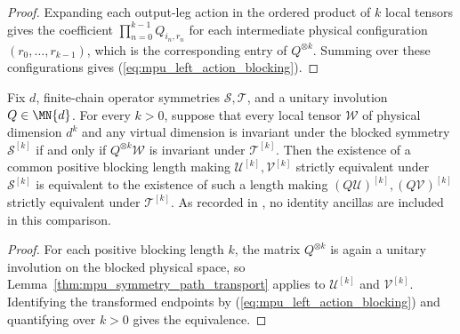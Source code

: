 \begin{proof}\leanok
    Expanding each output-leg action in the ordered product of $k$ local
    tensors gives the coefficient $\prod_{n=0}^{k-1} Q_{i_n,r_n}$ for each
    intermediate physical configuration $(r_0,\ldots,r_{k-1})$, which is
    the corresponding entry of $Q^{\otimes k}$. Summing over these
    configurations gives (\ref{eq:mpu_left_action_blocking}).
\end{proof}

\begin{lemma}
    \label{thm:mpu_positive_block_symmetry_path_transport}
    \leanok
    Fix $d$, finite-chain operator symmetries $\mathcal S,\mathcal T$,
    and a unitary involution $Q\in\MN{d}$. For every $k>0$, suppose that
    every local tensor $\mathcal W$ of physical dimension $d^k$ and any
    virtual dimension is invariant under the blocked symmetry
    $\mathcal S^{[k]}$ if and only if
    $Q^{\otimes k}\mathcal W$ is invariant under $\mathcal T^{[k]}$.
    Then the existence of a common positive blocking length making
    $\mathcal U^{[k]},\mathcal V^{[k]}$ strictly equivalent under
    $\mathcal S^{[k]}$ is equivalent to the existence of such a length
    making $(Q\mathcal U)^{[k]},(Q\mathcal V)^{[k]}$ strictly equivalent
    under $\mathcal T^{[k]}$. As recorded in
    \cite{gap:mpu_symmetry_ancilla_transport}, no identity ancillas are
    included in this comparison.
\end{lemma}

\begin{proof}\leanok
    For each positive blocking length $k$, the matrix $Q^{\otimes k}$ is
    again a unitary involution on the blocked physical space, so
    Lemma~\ref{thm:mpu_symmetry_path_transport} applies to
    $\mathcal U^{[k]}$ and $\mathcal V^{[k]}$. Identifying the transformed
    endpoints by (\ref{eq:mpu_left_action_blocking}) and quantifying over
    $k>0$ gives the equivalence.
\end{proof}

